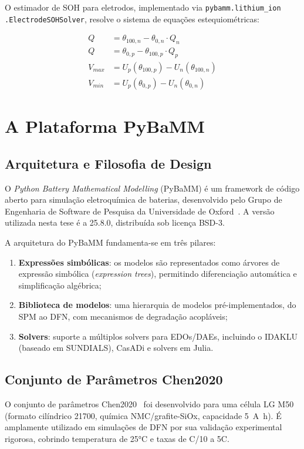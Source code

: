 \documentclass[
    12pt,
    openright,
    twoside,
    a4paper,
    brazil,
    english
]{abntex2}
\begin{document}
O estimador de SOH para eletrodos, implementado via \texttt{pybamm.lithium\_ion
.ElectrodeSOHSolver}, resolve o sistema de equações estequiométricas:

\begin{align}
  Q &= \theta_{100,n} - \theta_{0,n} \cdot Q_n \\
  Q &= \theta_{0,p} - \theta_{100,p} \cdot Q_p \\
  V_{max} &= U_p(\theta_{100,p}) - U_n(\theta_{100,n}) \\
  V_{min} &= U_p(\theta_{0,p}) - U_n(\theta_{0,n})
\end{align}

\section{A Plataforma PyBaMM}

\subsection{Arquitetura e Filosofia de Design}

O \textit{Python Battery Mathematical Modelling} (PyBaMM) é um framework de
código aberto para simulação eletroquímica de baterias, desenvolvido pelo
Grupo de Engenharia de Software de Pesquisa da Universidade de
Oxford~\cite{sulzer2021python}. A versão utilizada nesta tese é a 25.8.0,
distribuída sob licença BSD-3.

A arquitetura do PyBaMM fundamenta-se em três pilares:
\begin{enumerate}
  \item \textbf{Expressões simbólicas}: os modelos são representados como árvores
        de expressão simbólica (\textit{expression trees}), permitindo
        diferenciação automática e simplificação algébrica;
  \item \textbf{Biblioteca de modelos}: uma hierarquia de modelos pré-implementados,
        do SPM ao DFN, com mecanismos de degradação acopláveis;
  \item \textbf{Solvers}: suporte a múltiplos solvers para EDOs/DAEs, incluindo
        o IDAKLU (baseado em SUNDIALS), CasADi e solvers em Julia.
\end{enumerate}

\subsection{Conjunto de Parâmetros Chen2020}

O conjunto de parâmetros Chen2020~\cite{chen2020development} foi desenvolvido para
uma célula LG M50 (formato cilíndrico 21700, química NMC/grafite-SiOx, capacidade
\SI{5}{\ampere\hour}). É amplamente utilizado em simulações de DFN por sua
validação experimental rigorosa, cobrindo temperatura de 25°C e taxas de C/10 a 5C.
\end{document}
